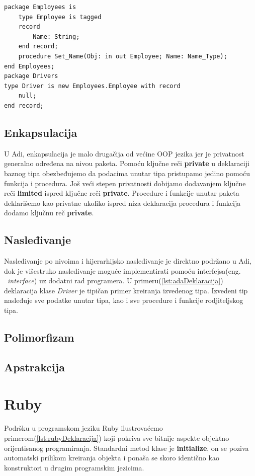 \documentclass[a4paper]{article}
\begin{document}
\begin{lstlisting}[caption={Primer objektno orijentisanog programiranja u jeziku Ada.},frame=single, label=lst:adaDeklaracija]
package Employees is 
	type Employee is tagged 
	record
		Name: String;
	end record;
	procedure Set_Name(Obj: in out Employee; Name: Name_Type);
end Employees;
package Drivers
type Driver is new Employees.Employee with record
	null;
end record;
\end{lstlisting}

\subsection{Enkapsulacija}
\label{subsec:adaEnkapsulacija}
U Adi, enkapsulacija je malo drugačija od većine OOP jezika jer je privatnost generalno određena na nivou paketa\cite{adaIntroduction}. Pomoću ključne reči \textbf{private} u deklaraciji baznog tipa obezbeđujemo da podacima unutar tipa pristupamo jedino pomoću funkcija i procedura. Još veći stepen privatnosti dobijamo dodavanjem ključne reči \textbf{limited} ispred ključne reči \textbf{private}. Procedure i funkcije unutar paketa deklarišemo kao privatne ukoliko ispred niza deklaracija procedura i funkcija dodamo ključnu reč \textbf{private}.

\subsection{Nasleđivanje}
\label{subsec:adaNasledjivanje}
Nasleđivanje po nivoima i hijerarhijsko nasleđivanje je direktno podržano u Adi, dok je višestruko nasleđivanje moguće implementirati pomoću interfejsa(eng. ~{\em interface}) uz dodatni rad programera. U primeru(\ref{lst:adaDeklaracija}) deklaracija klase \textit{Driver} je tipičan primer kreiranja izvedenog tipa. Izvedeni tip nasleđuje sve podatke unutar tipa, kao i sve procedure i funkcije rodjiteljskog tipa.

\subsection{Polimorfizam}
\label{subsec:adaPolimorfizam}

\subsection{Apstrakcija}
\label{subsec:adaApstrakcija}

\section{Ruby}
\label{sec:ruby}
 Podršku u programskom jeziku Ruby ilustrovaćemo primerom(\ref{lst:rubyDeklaracija}) koji pokriva sve bitnije aspekte objektno orijentisanog programiranja. Standardni metod klase je \textbf{initialize}, on se poziva automatski prilikom kreiranja objekta i ponaša se skoro identično kao konstruktori u drugim programskim jezicima.
\end{document}
